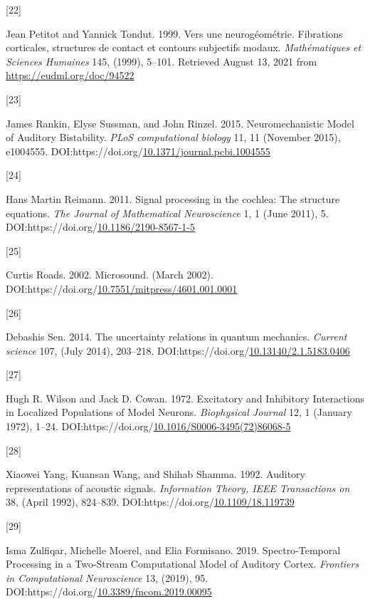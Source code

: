 \documentclass[
  american,
]{article}
\newlength{\cslhangindent}
\newlength{\csllabelwidth}
\newlength{\cslentryspacingunit} %
\newenvironment{CSLReferences}[2] %
 {%
  \setlength{\parindent}{0pt}
  \ifodd #1
  \let\oldpar\par
  \def\par{\hangindent=\cslhangindent\oldpar}
  \fi
  \setlength{\parskip}{#2\cslentryspacingunit}
 }%
 {}
\newcommand{\CSLLeftMargin}[1]{\parbox[t]{\csllabelwidth}{#1}}
\newcommand{\CSLRightInline}[1]{\parbox[t]{\linewidth - \csllabelwidth}{#1}\break}
\begin{document}
\begin{CSLReferences}{0}{0}
\leavevmode{}%
\CSLLeftMargin{{[}22{]} }
\CSLRightInline{Jean Petitot and Yannick Tondut. 1999. Vers une neurogéométrie. {Fibrations} corticales, structures de contact et contours subjectifs modaux. \emph{Mathématiques et Sciences Humaines} 145, (1999), 5--101. Retrieved August 13, 2021 from \url{https://eudml.org/doc/94522}}

\leavevmode{}%
\CSLLeftMargin{{[}23{]} }
\CSLRightInline{James Rankin, Elyse Sussman, and John Rinzel. 2015. Neuromechanistic {Model} of {Auditory} {Bistability}. \emph{PLoS computational biology} 11, 11 (November 2015), e1004555. DOI:https://doi.org/\href{https://doi.org/10.1371/journal.pcbi.1004555}{10.1371/journal.pcbi.1004555}}

\leavevmode{}%
\CSLLeftMargin{{[}24{]} }
\CSLRightInline{Hans Martin Reimann. 2011. Signal processing in the cochlea: The structure equations. \emph{The Journal of Mathematical Neuroscience} 1, 1 (June 2011), 5. DOI:https://doi.org/\href{https://doi.org/10.1186/2190-8567-1-5}{10.1186/2190-8567-1-5}}

\leavevmode{}%
\CSLLeftMargin{{[}25{]} }
\CSLRightInline{Curtis Roads. 2002. Microsound. (March 2002). DOI:https://doi.org/\href{https://doi.org/10.7551/mitpress/4601.001.0001}{10.7551/mitpress/4601.001.0001}}

\leavevmode{}%
\CSLLeftMargin{{[}26{]} }
\CSLRightInline{Debashis Sen. 2014. The uncertainty relations in quantum mechanics. \emph{Current science} 107, (July 2014), 203--218. DOI:https://doi.org/\href{https://doi.org/10.13140/2.1.5183.0406}{10.13140/2.1.5183.0406}}

\leavevmode{}%
\CSLLeftMargin{{[}27{]} }
\CSLRightInline{Hugh R. Wilson and Jack D. Cowan. 1972. Excitatory and {Inhibitory} {Interactions} in {Localized} {Populations} of {Model} {Neurons}. \emph{Biophysical Journal} 12, 1 (January 1972), 1--24. DOI:https://doi.org/\href{https://doi.org/10.1016/S0006-3495(72)86068-5}{10.1016/S0006-3495(72)86068-5}}

\leavevmode{}%
\CSLLeftMargin{{[}28{]} }
\CSLRightInline{Xiaowei Yang, Kuansan Wang, and Shihab Shamma. 1992. Auditory representations of acoustic signals. \emph{Information Theory, IEEE Transactions on} 38, (April 1992), 824--839. DOI:https://doi.org/\href{https://doi.org/10.1109/18.119739}{10.1109/18.119739}}

\leavevmode{}%
\CSLLeftMargin{{[}29{]} }
\CSLRightInline{Isma Zulfiqar, Michelle Moerel, and Elia Formisano. 2019. Spectro-{Temporal} {Processing} in a {Two}-{Stream} {Computational} {Model} of {Auditory} {Cortex}. \emph{Frontiers in Computational Neuroscience} 13, (2019), 95. DOI:https://doi.org/\href{https://doi.org/10.3389/fncom.2019.00095}{10.3389/fncom.2019.00095}}

\end{CSLReferences}
\end{document}
